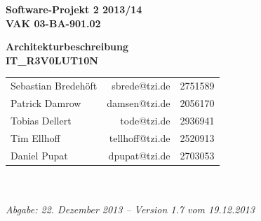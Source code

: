 \documentclass[fontsize=12pt,paper=a4,twoside]{scrartcl}
\begin{document}
\thispagestyle{fancy} \fancyhead[LO,RE]{ }  \fancyfoot[C]{}

\vspace{3cm} 
\begin{minipage}
	[H]{ 
	\textwidth} 
	\begin{center}
		\bf \Large Software-Projekt 2 2013/14\\
		\smallskip \small VAK 03-BA-901.02\\
		\vspace{3cm} 
	\end{center}
\end{minipage}
\begin{minipage}
	[H]{ 
	\textwidth} 
	\begin{center}
		\vspace{1cm} \bf \Large Architekturbeschreibung\\
		\vspace{3ex} \small IT\_R3V0LUT10N\\
		\vfill 
	\end{center}
\end{minipage}
\vfill 
\begin{minipage}
	[H]{ 
	\textwidth} 
	\begin{center}
		\sf 
		\begin{tabular}
			{lrr} Sebastian Bredehöft & sbrede@tzi.de & 2751589\\
			Patrick Damrow & damsen@tzi.de & 2056170\\
			Tobias Dellert & tode@tzi.de & 2936941\\
			Tim Ellhoff & tellhoff@tzi.de & 2520913\\
			Daniel Pupat & dpupat@tzi.de & 2703053\\
		\end{tabular}
		\\
		~ \vspace{2cm} \\
		\it Abgabe: 22. Dezember 2013 -- Version 1.7 vom 19.12.2013 \\
		~ 
	\end{center}
\end{minipage}

\newpage

\thispagestyle{fancy} \fancyhead{}   \fancyfoot{} 
\renewcommand{\headrulewidth}{0.4pt} 
\tableofcontents
\newpage
\listoffigures
\end{document}
